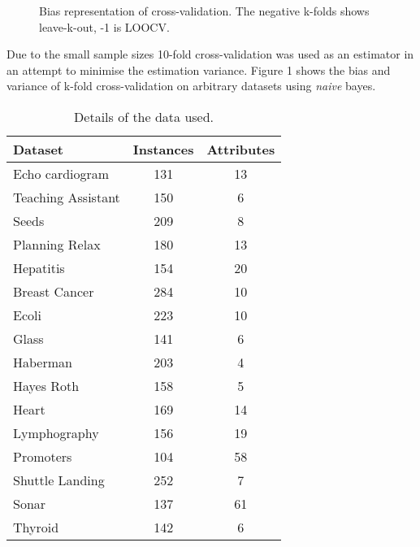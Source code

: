 \documentclass{cmppgr}
\begin{document}
\begin{figure}[!ht]
	\begin{subfigure}[b]{0.40\textwidth}
	\end{subfigure}
	\caption{Bias representation of cross-validation. The negative k-folds shows leave-k-out, -1 is LOOCV.}
\end{figure} 

Due to the small sample sizes 10-fold cross-validation was used as an estimator in an attempt to minimise the estimation variance. Figure 1 shows the bias and variance of k-fold cross-validation on arbitrary datasets using \textit{naive} bayes.


\begin{table}[h]
	\centering
	\caption{Details of the data used.}
	\begin{tabular}{|l|c|c|}
		\hline
		Dataset & Instances & Attributes \\\hline\hline
		Echo cardiogram & 131 & 13\\
		Teaching Assistant & 150 & 6\\
		Seeds & 209 & 8\\
		Planning Relax & 180 & 13\\
	    Hepatitis & 154 & 20\\
		Breast Cancer & 284 & 10\\
		Ecoli & 223 &10 \\
		Glass & 141 &6  \\
		Haberman & 203  &4 \\
		Hayes Roth & 158 &5 \\
		Heart & 169 & 14\\
		Lymphography & 156 &19 \\
		Promoters & 104 &58  \\
		Shuttle Landing & 252  &7 \\
		Sonar & 137 &61 \\
		Thyroid & 142 & 6\\\hline
	\end{tabular}
	\label{tab:example}
\end{table}
\end{document}

